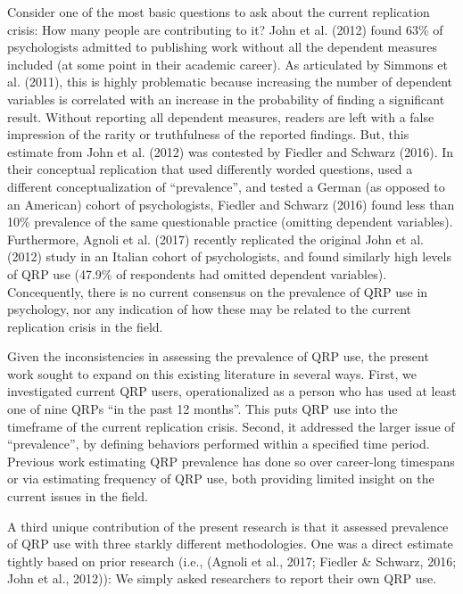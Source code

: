 \documentclass[jou]{apa6}
\theoremstyle{definition}
\theoremstyle{definition}
\theoremstyle{definition}
\theoremstyle{remark}
\begin{document}
Consider one of the most basic questions to ask about the current
replication crisis: How many people are contributing to it? John et al.
(2012) found 63\% of psychologists admitted to publishing work without
all the dependent measures included (at some point in their academic
career). As articulated by Simmons et al. (2011), this is highly
problematic because increasing the number of dependent variables is
correlated with an increase in the probability of finding a significant
result. Without reporting all dependent measures, readers are left with
a false impression of the rarity or truthfulness of the reported
findings. But, this estimate from John et al. (2012) was contested by
Fiedler and Schwarz (2016). In their conceptual replication that used
differently worded questions, used a different conceptualization of
\enquote{prevalence}, and tested a German (as opposed to an American)
cohort of psychologists, Fiedler and Schwarz (2016) found less than 10\%
prevalence of the same questionable practice (omitting dependent
variables). Furthermore, Agnoli et al. (2017) recently replicated the
original John et al. (2012) study in an Italian cohort of psychologists,
and found similarly high levels of QRP use (47.9\% of respondents had
omitted dependent variables). Concequently, there is no current
consensus on the prevalence of QRP use in psychology, nor any indication
of how these may be related to the current replication crisis in the
field.

Given the inconsistencies in assessing the prevalence of QRP use, the
present work sought to expand on this existing literature in several
ways. First, we investigated current QRP users, operationalized as a
person who has used at least one of nine QRPs \enquote{in the past 12
months}. This puts QRP use into the timeframe of the current replication
crisis. Second, it addressed the larger issue of \enquote{prevalence},
by defining behaviors performed within a specified time period. Previous
work estimating QRP prevalence has done so over career-long timespans or
via estimating frequency of QRP use, both providing limited insight on
the current issues in the field.

A third unique contribution of the present research is that it assessed
prevalence of QRP use with three starkly different methodologies. One
was a direct estimate tightly based on prior research (i.e., (Agnoli et
al., 2017; Fiedler \& Schwarz, 2016; John et al., 2012)): We simply
asked researchers to report their own QRP use.
\end{document}
